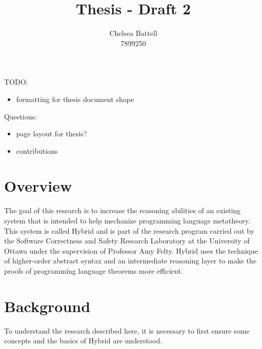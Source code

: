 \documentclass{report}[12pt]
\title{Thesis - Draft 2}
\author{Chelsea Battell \\ 7899250}
\begin{document}
TODO:
\begin{itemize}
 \item formatting for thesis document shape
\end{itemize}

Questions:
\begin{itemize}
 \item page layout for thesis?
 \item contributions
\end{itemize}


\chapter{Overview}

The goal of this research is to increase the reasoning abilities of an existing system that is intended to help mechanize programming language metatheory. This system is called Hybrid and is part of the research program carried out by the Software Correctness and Safety Research Laboratory at the University of Ottawa under the supervision of Professor Amy Felty. Hybrid uses the technique of higher-order abstract syntax and an intermediate reasoning layer to make the proofs of programming language theorems more efficient.




\chapter{Background}

To understand the research described here, it is necessary to first ensure some concepts and the basics of Hybrid are understood.











\end{document}
